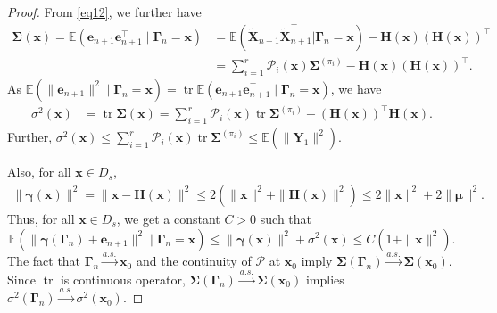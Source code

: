 \documentclass[10pt,a4paper]{amsart}
\begin{document}
\begin{proof}
{From \eqref{eq12}, we further have
\begin{align*}
\boldsymbol{\Sigma}\left(\boldsymbol{x}\right) = \mathbb{E}\left(\boldsymbol{e}_{n+1}\boldsymbol{e}^{\top}_{n+1} \mid \boldsymbol{\Gamma}_{n} = \boldsymbol{x}\right) &= \mathbb{E}\left( \boldsymbol{\widetilde{X}}_{n+1}\boldsymbol{\widetilde{X}}^{\top}_{n+1} \Big| \boldsymbol{\Gamma}_{n} = \boldsymbol{x}\right) - 
\boldsymbol{H}\left(\boldsymbol{x}\right)\left(\boldsymbol{H}\left(\boldsymbol{x}\right)\right)^{\top}
        \\ &= \sum_{i=1}^{r}\mathcal{P}_i\left(\boldsymbol{x}\right)\boldsymbol{\Sigma}^{(\pi_i)}
        -  \boldsymbol{H}\left(\boldsymbol{x}\right)\left(\boldsymbol{H}\left(\boldsymbol{x}\right)\right)^{\top}.
\end{align*}
As $\mathbb{E}\left(\|\boldsymbol{e}_{n+1}\|^2 \mid \boldsymbol{\Gamma}_{n} = \boldsymbol{x}\right) = \operatorname{tr} \mathbb{E}\left(\boldsymbol{e}_{n+1}\boldsymbol{e}^{\top}_{n+1} \mid \boldsymbol{\Gamma}_{n} = \boldsymbol{x}\right)$,
we have 
\begin{align*}%
\sigma^2\left(\boldsymbol{x}\right) &= \operatorname{tr} \boldsymbol{\Sigma} (\boldsymbol{x}) 
 = \sum_{i=1}^{r}\mathcal{P}_i\left(\boldsymbol{x}\right)\operatorname{tr}\boldsymbol{\Sigma}^{(\pi_i)} - \left(\boldsymbol{H}\left(\boldsymbol{x}\right)\right)^{\top}\boldsymbol{H}\left(\boldsymbol{x}\right).
  \end{align*}}
Further, 
$\sigma^2\left(\boldsymbol{x}\right) \leq \sum_{i=1}^{r}\mathcal{P}_i\left(\boldsymbol{x}\right)\operatorname{tr}\boldsymbol{\Sigma}^{(\pi_i)} 
  \leq \mathbb{E}\left(\|\boldsymbol{Y}_1\|^2\right)$. %

{Also, for all $\boldsymbol{x} \in {D}_s$,
\begin{align*}
    \|\boldsymbol{\gamma}\left(\boldsymbol{x}\right)\|^2 = \|\boldsymbol{x}-\boldsymbol{H}(\boldsymbol{x})\|^2 \leq 2\left(\|\boldsymbol{x}\|^2 + \|\boldsymbol{H}(\boldsymbol{x})\|^2\right) \leq 2\|\boldsymbol{x}\|^2 + 2 \|\boldsymbol{\mu}\|^2.
\end{align*}
Thus, for all $\boldsymbol{x} \in {D}_s$, we get a constant $C > 0$ such that
\[
  \mathbb{E}\left(\|\boldsymbol{\gamma}(\boldsymbol{\Gamma}_n) + \boldsymbol{e}_{n+1}\|^2 \mid \boldsymbol{\Gamma}_n = \boldsymbol{x}\right) \leq \|\boldsymbol{\gamma}\left(\boldsymbol{x}\right)\|^2 +  \sigma^2\left(\boldsymbol{x}\right) \leq C(1+\|\boldsymbol{x}\|^2).
\]}%
{The fact that $\boldsymbol{\Gamma}_n \stackrel{a.s.}{\to} \boldsymbol{x}_0$ and the continuity of $\boldsymbol{\mathcal{P}}$ at $\boldsymbol{x}_0$ imply $\boldsymbol{\Sigma}\left(\boldsymbol{\Gamma}_n\right) \stackrel{a.s.}{\to} \boldsymbol{\Sigma}\left(\boldsymbol{x}_0\right)$. Since $\operatorname{tr}$ is continuous operator, $\boldsymbol{\Sigma}\left(\boldsymbol{\Gamma}_n\right) \stackrel{a.s.}{\to} \boldsymbol{\Sigma}\left(\boldsymbol{x}_0\right)$ implies ${\sigma^2}\left(\boldsymbol{\Gamma}_n\right) \stackrel{a.s.}{\to} {\sigma^2}\left(\boldsymbol{x}_0\right)$.}


\end{proof}
\end{document}
